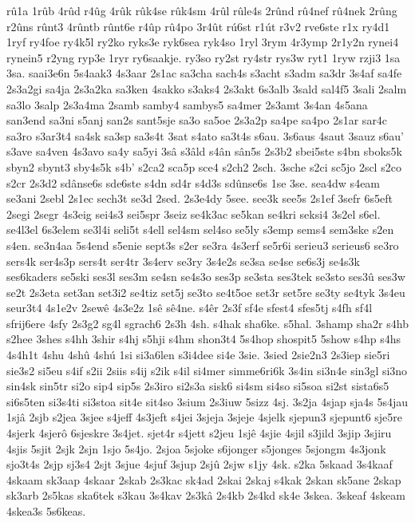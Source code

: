 {rû1a
1rûb
4rûd
r4ûg
4rûk
rûk4se
rûk4sm
4rûl
rûle4s
2rûnd
rû4nef
rû4nek
2rûng
r2ûns
rûnt3
4rûntb
rûnt6e
r4ûp
rû4po
3r4ût
rú6st
r1út
r3v2
rve6ste
r1x
ry4d1
1ryf
ry4foe
ry4k5l
ry2ko
ryks3e
ryk6sea
ryk4so
1ryl
3rym
4r3ymp
2r1y2n
rynei4
rynein5
r2yng
ryp3e
1ryr
ry6saakje.
ry3so
ry2st
ry4str
rys3w
ryt1
1ryw
rzji3
1sa
3sa.
saai3e6n
5s4aak3
4s3aar
2s1ac
sa3cha
sach4s
s3acht
s3adm
sa3dr
3s4af
sa4fe
2s3a2gi
sa4ja
2s3a2ka
sa3ken
4sakko
s3aks4
2s3akt
6s3alb
3sald
sal4f5
3sali
2salm
sa3lo
3salp
2s3a4ma
2samb
samby4
sambys5
sa4mer
2s3amt
3s4an
4s5ana
san3end
sa3ni
s5anj
san2s
sant5sje
sa3o
sa5oe
2s3a2p
sa4pe
sa4po
2s1ar
sar4c
sa3ro
s3ar3t4
sa4sk
sa3sp
sa3s4t
3sat
s4ato
sa3t4s
s6au.
3s6aus
4saut
3sauz
s6au'
s3ave
sa4ven
4s3avo
sa4y
sa5yi
3sâ
s3âld
s4ân
sân5s
2s3b2
sbei5ste
s4bn
sboks5k
sbyn2
sbynt3
sby4s5k
s4b'
s2ca2
sca5p
sce4
s2ch2
2sch.
3sche
s2ci
sc5jo
2scl
s2co
s2cr
2s3d2
sdânse6s
sde6ste
s4dn
sd4r
s4d3s
sdûnse6s
1se
3se.
sea4dw
s4eam
se3ani
2sebl
2s1ec
sech3t
se3d
2sed.
2s3e4dy
5see.
see3k
see5s
2s1ef
3sefr
6s5eft
2segi
2segr
4s3eig
sei4s3
sei5spr
3seiz
se4k3ac
se5kan
se4kri
seksi4
3s2el
s6el.
se4l3el
6s3elem
se3l4i
seli5t
s4ell
sel4sm
sel4so
se5ly
s3emp
sems4
sem3ske
s2en
s4en.
se3n4aa
5s4end
s5enie
sept3s
s2er
se3ra
4s3erf
se5r6i
serieu3
serieus6
se3ro
sers4k
ser4s3p
sers4t
ser4tr
3s4erv
se3ry
3s4e2s
se3sa
se4se
se6s3j
se4s3k
ses6kaders
se5ski
ses3l
ses3m
se4sn
se4s3o
ses3p
se3sta
ses3tek
se3sto
ses3û
ses3w
se2t
2s3eta
set3an
set3i2
se4tiz
set5j
se3to
se4t5oe
set3r
set5re
se3ty
se4tyk
3s4eu
seur3t4
4s1e2v
2sewê
4s3e2z
1sê
sê4ne.
s4êr
2s3f
sf4e
sfest4
sfes5tj
s4fh
sf4l
sfrij6ere
4sfy
2s3g2
sg4l
sgrach6
2s3h
4sh.
s4hak
sha6ke.
s5hal.
3shamp
sha2r
s4hb
s2hee
3shes
s4hh
3shir
s4hj
s5hji
s4hm
shon3t4
5s4hop
shospit5
5show
s4hp
s4hs
4s4h1t
4shu
4shû
4shú
1si
si3a6len
s3i4dee
si4e
3sie.
3sied
2sie2n3
2s3iep
sie5ri
sie3s2
si5eu
s4if
s2ii
2siis
s4ij
s2ik
s4il
si4mer
simme6ri6k
3s4in
si3n4e
sin3gl
si3no
sin4sk
sin5tr
si2o
sip4
sip5s
2s3iro
si2s3a
sisk6
si4sm
si4so
si5soa
si2st
sista6s5
si6s5ten
si3s4ti
si3stoa
sit4e
sit4so
3sium
2s3iuw
5sizz
4sj.
3s2ja
4sjap
sja4s
5s4jau
1sjâ
2sjb
s2jea
3sjee
s4jeff
4s3jeft
s4jei
3sjeja
3sjeje
4sjelk
sjepun3
sjepunt6
sje5re
4sjerk
4sjerô
6sjeskre
3s4jet.
sjet4r
s4jett
s2jeu
1sjê
4sjie
4sjil
s3jild
3sjip
3sjiru
4sjis
5sjit
2sjk
2sjn
1sjo
5s4jo.
2sjoa
5sjoke
s6jonger
s5jonges
5sjongm
4s3jonk
sjo3t4s
2sjp
sj3s4
2sjt
3sjue
4sjuf
3sjup
2sjû
2sjw
s1jy
4sk.
s2ka
5skaad
3s4kaaf
4skaam
sk3aap
4skaar
2skab
2s3kac
sk4ad
2skai
2skaj
s4kak
2skan
sk5ane
2skap
sk3arb
2s5kas
ska6tek
s3kau
3s4kav
2s3kâ
2s4kb
2s4kd
sk4e
3skea.
3skeaf
4skeam
4skea3s
5s6keas.
}
